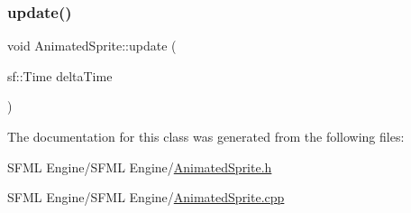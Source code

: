 \hypertarget{class_animated_sprite_a17a41ff812631a9d8947d272933d6696}{}\label{class_animated_sprite_a17a41ff812631a9d8947d272933d6696} 
\subsubsection{\texorpdfstring{update()}{update()}}
{\footnotesize\ttfamily void Animated\+Sprite\+::update (\begin{DoxyParamCaption}\item[{sf\+::\+Time}]{delta\+Time }\end{DoxyParamCaption})}



The documentation for this class was generated from the following files\+:\begin{DoxyCompactItemize}
\item 
S\+F\+M\+L Engine/\+S\+F\+M\+L Engine/\hyperlink{_animated_sprite_8h}{Animated\+Sprite.\+h}\item 
S\+F\+M\+L Engine/\+S\+F\+M\+L Engine/\hyperlink{_animated_sprite_8cpp}{Animated\+Sprite.\+cpp}\end{DoxyCompactItemize}
